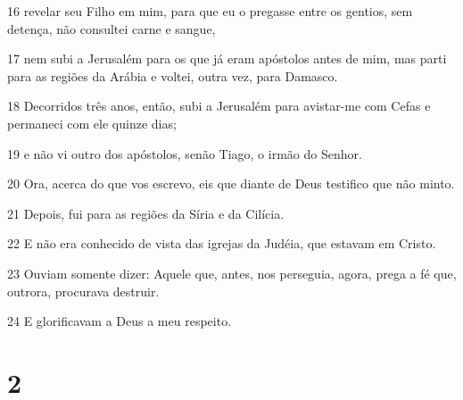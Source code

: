 \par 16 revelar seu Filho em mim, para que eu o pregasse entre os gentios, sem detença, não consultei carne e sangue,
\par 17 nem subi a Jerusalém para os que já eram apóstolos antes de mim, mas parti para as regiões da Arábia e voltei, outra vez, para Damasco.
\par 18 Decorridos três anos, então, subi a Jerusalém para avistar-me com Cefas e permaneci com ele quinze dias;
\par 19 e não vi outro dos apóstolos, senão Tiago, o irmão do Senhor.
\par 20 Ora, acerca do que vos escrevo, eis que diante de Deus testifico que não minto.
\par 21 Depois, fui para as regiões da Síria e da Cilícia.
\par 22 E não era conhecido de vista das igrejas da Judéia, que estavam em Cristo.
\par 23 Ouviam somente dizer: Aquele que, antes, nos perseguia, agora, prega a fé que, outrora, procurava destruir.
\par 24 E glorificavam a Deus a meu respeito.

\chapter{2}

